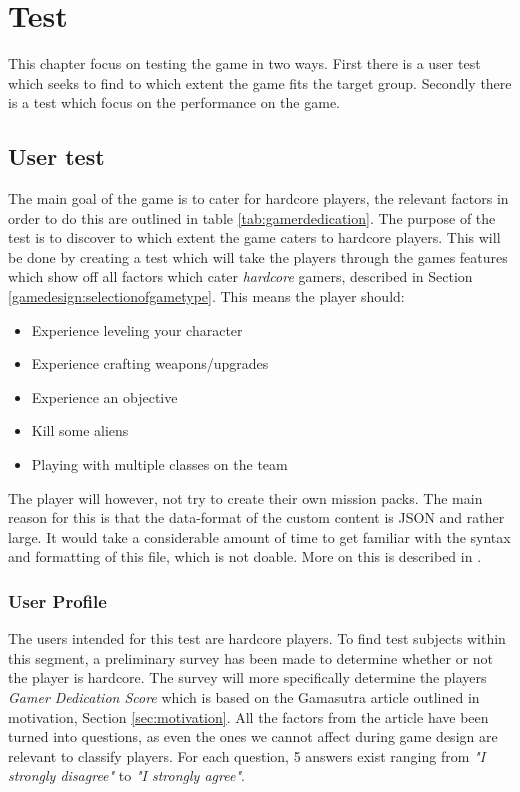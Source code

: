 \chapter{Test}
This chapter focus on testing the game in two ways. First there is a user test which seeks to find to which extent the game fits the target group. Secondly there is a test which focus on the performance on the game.

\section{User test}
The main goal of the game is to cater for hardcore players, the relevant factors in order to do this are outlined in table \ref{tab:gamerdedication}.
The purpose of the test is to discover to which extent the game caters to hardcore players.
This will be done by creating a test which will take the players through the games features which show off all factors which cater \emph{hardcore} gamers, described in Section \ref{gamedesign:selectionofgametype}.
This means the player should:
\begin{itemize}
	\item Experience leveling your character
	\item Experience crafting weapons/upgrades
	\item Experience an objective
	\item Kill some aliens
	\item Playing with multiple classes on the team
\end{itemize}

The player will however, not try to create their own mission packs. The main reason for this is that the data-format of the custom content is JSON and rather large. It would take a considerable amount of time to get familiar with the syntax and formatting of this file, which is not doable. More on this is described in .

\subsection{User Profile}
The users intended for this test are hardcore players.
To find test subjects within this segment, a preliminary survey has been made to determine whether or not the player is hardcore.
The survey will more specifically determine the players \textit{Gamer Dedication Score} which is based on the Gamasutra article\cite{casual_vs_hardcore} outlined in motivation, Section \ref{sec:motivation}.
All the factors from the article have been turned into questions, as even the ones we cannot affect during game design are relevant to classify players.
For each question, 5 answers exist ranging from \textit{"I strongly disagree"} to \textit{"I strongly agree"}.


